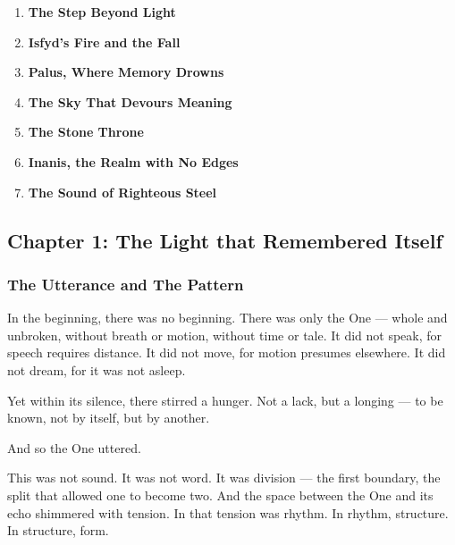 \documentclass[12pt]{article}
\begin{document}
\begin{enumerate}
    \item \textbf{The Step Beyond Light} 

    \vspace{1em}
    \item \textbf{Isfyd's Fire and the Fall} 

    \vspace{1em}
    \item \textbf{Palus, Where Memory Drowns} 

    \vspace{1em}
    \item \textbf{The Sky That Devours Meaning} 

    \vspace{1em}
    \item \textbf{The Stone Throne} 

    \vspace{1em}
    \item \textbf{Inanis, the Realm with No Edges}

    \vspace{1em}
    \item \textbf{The Sound of Righteous Steel} 

\end{enumerate}

\newpage

\subsection*{Chapter 1: The Light that Remembered Itself}

\vspace{.5in}

\subsubsection*{The Utterance and The Pattern}

In the beginning, there was no beginning. There was only the One — whole and unbroken, without breath or motion, without time or tale.  
It did not speak, for speech requires distance.  
It did not move, for motion presumes elsewhere.  
It did not dream, for it was not asleep.

Yet within its silence, there stirred a hunger. Not a lack, but a longing — to be known, not by itself, but by another.

And so the One uttered.

This was not sound. It was not word. It was division — the first boundary, the split that allowed one to become two.  
And the space between the One and its echo shimmered with tension.  
In that tension was rhythm. In rhythm, structure. In structure, form.
\end{document}
